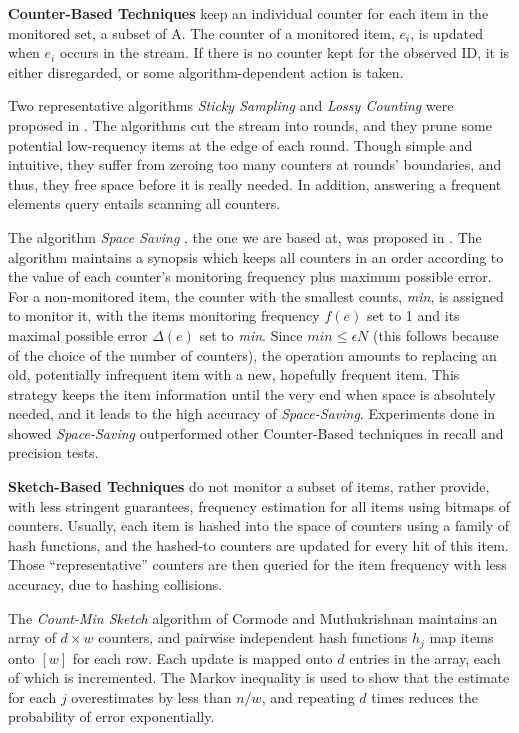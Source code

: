 \documentclass[conference]{IEEEtran}
\begin{document}
\textbf{Counter-Based Techniques} keep an individual counter for each item in the monitored set, a subset of A. The counter of a monitored item, $e_i$, is updated when $e_i$ occurs in the stream. If there is no counter kept for the observed ID, it is either disregarded, or some algorithm-dependent action is taken.\par

Two representative algorithms \emph{Sticky Sampling} and \emph{Lossy Counting} were proposed in \cite{IEEEexample:sticky}. The algorithms cut the stream into rounds, and they prune some potential low-requency items at the edge of each round. Though simple and intuitive, they suffer from zeroing too many counters at rounds’ boundaries, and thus, they free space before it is really needed. In addition, answering a frequent elements query entails scanning all counters.\par

The algorithm \emph{Space Saving} , the one we are based at, was proposed in \cite{IEEEexample:spacesaving}. The algorithm maintains a synopsis which keeps all counters in an order according to the value of each counter's monitoring frequency plus maximum possible error. For a non-monitored item, the counter with the smallest counts, \emph{min}, is assigned to monitor it, with the items monitoring frequency $f(e)$ set to 1 and its maximal possible error $\Delta(e)$ set to \emph{min}. Since $min\leq\epsilon N$ (this follows because of the choice of the number of counters), the operation amounts to replacing an old, potentially infrequent item with a new, hopefully frequent item. This strategy keeps the item information until the very end when space is absolutely needed, and it leads to the high accuracy of \emph{Space-Saving}. Experiments done in \cite{IEEEexample:overview_vldbj,IEEEexample:overview} showed \emph{Space-Saving} outperformed other Counter-Based techniques in recall and precision tests.\par

\textbf{Sketch-Based Techniques} do not monitor a subset of items, rather provide, with less stringent guarantees, frequency estimation for all items using bitmaps of counters. Usually, each item is hashed into the space of counters using a family of hash functions, and the hashed-to counters are updated for every hit of this item. Those “representative” counters are then queried for the item frequency with less accuracy, due to hashing collisions.\par

The \emph{Count-Min Sketch} algorithm of Cormode and Muthukrishnan \cite{IEEEexample:count-min} maintains an array of $d\times w$ counters, and pairwise independent hash functions $h_j$ map items onto $[w]$ for each row. Each update is mapped onto $d$ entries in the array, each of which is incremented. The Markov inequality is used to show that the estimate for each $j$ overestimates by less than $n/w$, and repeating $d$ times reduces the probability of error exponentially.\par
\end{document}
